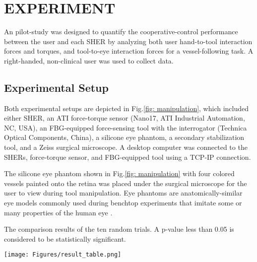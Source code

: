 \documentclass[letterpaper, 10 pt, conference]{ieeeconf}  %
\begin{document}

\section{EXPERIMENT}
An pilot-study was designed to quantify the cooperative-control performance between the user and each SHER by analyzing both user hand-to-tool interaction forces and torques, and tool-to-eye interaction forces for a vessel-following task. A right-handed, non-clinical user was used to collect data.

\subsection{Experimental Setup}

Both experimental setups are depicted in Fig.\ref{fig: manipulation}, which included either SHER, an ATI force-torque sensor (Nano17, ATI Industrial Automation, NC, USA), an FBG-equipped force-sensing tool with the interrogator (Technica Optical Components, China), a silicone eye phantom, a secondary stabilization tool, and a Zeiss surgical microscope. A desktop computer was connected to the SHERs, force-torque sensor, and FBG-equipped tool using a TCP-IP connection.

The silicone eye phantom shown in Fig.\ref{fig: manipulation} with four colored vessels painted onto the retina was placed under the surgical microscope for the user to view during tool manipulation. Eye phantoms are anatomically-similar eye models commonly used during benchtop experiments that imitate some or many properties of the human eye \cite{gupta2014human}.

\begin{table*}[t!]
\centering
    \caption{The comparison results of the ten random trials. A p-value less than 0.05 is considered to be statistically significant.}
    \texttt{[image: Figures/result\_table.png]}
      \label{table1}
\end{table*}
\end{document}
